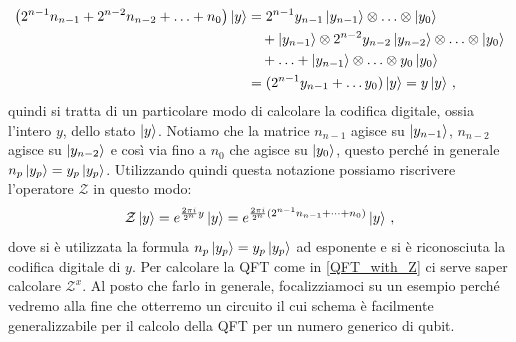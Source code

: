 \begin{align*}
    \left( 2^{n-1} n_{n-1} + 2^{n-2} n_{n-2} + \ldots + n_0 \right) \ket y &= 2^{n-1} y_{n-1} \ket{y_{n-1}} \otimes \ldots \otimes \ket{y_0} \\
    &\quad + \ket{y_{n-1}} \otimes 2^{n-2} y_{n-2} \ket{y_{n-2}} \otimes \ldots \otimes \ket{y_0} \\
    &\quad + \ldots + \ket{y_{n-1}} \otimes \ldots \otimes y_0 \ket{y_0} \\
    &= (2^{n-1} y_{n-1} + \ldots y_0) \ket{y} = y\ket y \, ,
\end{align*}
quindi si tratta di un particolare modo di calcolare la codifica digitale, ossia l'intero $y$, dello stato $\ket{y}$. Notiamo che la matrice $n_{n-1}$ agisce su $\ket{y_{n-1}}$, $n_{n-2}$ agisce su $\ket{y_{n-2}}$ e così via fino a $n_0$ che agisce su $\ket{y_0}$,   questo perché in generale $n_p \ket{y_p} = y_p \ket{y_p}$. Utilizzando quindi questa notazione possiamo riscrivere l'operatore $\mathcal{Z}$ in questo modo: 
\begin{equation*}
    \mathcal{Z} \ket y = e^{\frac{2 \pi i}{2^n} y} \ket y = e^{\frac{2\pi i}{2^n} (2^{n-1}n_{n-1}+\dots+n_0)} \ket y \, ,
\end{equation*}
dove si è utilizzata la formula $n_p \ket{y_p} = y_p \ket{y_p}$ ad esponente e si è riconosciuta la codifica digitale di $y$. Per calcolare la QFT come in \eqref{QFT_with_Z} ci serve saper calcolare $\mathcal{Z}^x$. Al posto che farlo in generale, focalizziamoci su un esempio perché vedremo alla fine che otterremo un circuito il cui schema è facilmente generalizzabile per il calcolo della QFT per un numero generico di qubit.


